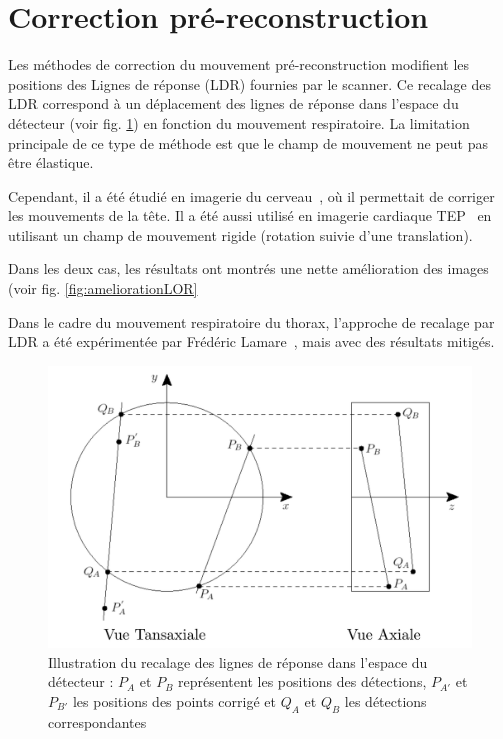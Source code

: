 \section{Correction pré-reconstruction}

Les méthodes de correction du mouvement pré-reconstruction modifient les positions des Lignes de réponse (LDR) fournies par le scanner.
Ce recalage des LDR correspond à un déplacement des lignes de réponse dans l'espace du détecteur (voir fig. \ref{fig:recalageLOR}) en fonction du mouvement respiratoire. La limitation principale de ce type de méthode est que le champ de mouvement ne peut pas être élastique.

Cependant, il a été étudié en imagerie du cerveau~\cite{bloomfield2003design}, où il permettait de corriger les mouvements de la tête. Il a été aussi utilisé en imagerie cardiaque TEP~\cite{livieratos2005rigid} en utilisant un champ de mouvement rigide (rotation suivie d'une translation).

Dans les deux cas, les résultats ont montrés une nette amélioration des images (voir fig. \ref{fig:ameliorationLOR}

Dans le cadre du mouvement respiratoire du thorax, l'approche de recalage par LDR a été expérimentée par Frédéric Lamare~\cite{lamare2007respiratory}, mais avec des résultats mitigés.

\begin{figure}[h!]
	\begin{center}
		\includegraphics[width=12cm]{images/recalageLOR}
	\end{center}
	\caption{Illustration du recalage des lignes de réponse dans l'espace du détecteur : $P_A$ et $P_B$ représentent les positions des détections, $P_{A'}$ et $P_{B'}$ les positions des points corrigé et $Q_A$ et $Q_B$ les détections correspondantes } 
	\label{fig:recalageLOR}
\end{figure}

